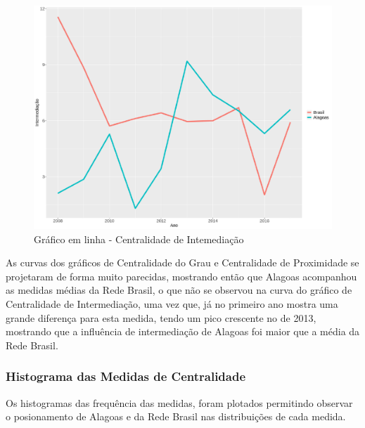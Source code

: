 \documentclass[12pt]{article}
\begin{document}
\begin{figure}[H]
\centering
\includegraphics[scale=0.5]{images/graf-linha-betweeness-br-al.pdf}
\caption{Gráfico em linha - Centralidade de Intemediação}
\label{c2}
\end{figure}

As curvas dos gráficos de Centralidade do Grau e Centralidade de Proximidade se projetaram de forma muito parecidas, mostrando então que Alagoas acompanhou as medidas médias da Rede Brasil, o que não se observou na curva do gráfico de Centralidade de Intermediação, uma vez que, já no primeiro ano mostra uma grande diferença para esta medida, tendo um pico crescente no de 2013, mostrando que a influência de intermediação de Alagoas foi maior que a média da Rede Brasil.

\subsubsection{Histograma das Medidas de Centralidade}

Os histogramas das frequência das medidas, foram plotados permitindo observar o posionamento de Alagoas e da Rede Brasil nas distribuições de cada medida.
\end{document}

